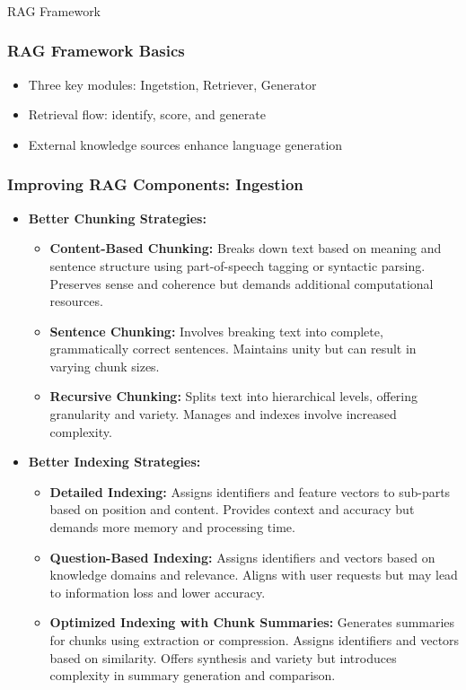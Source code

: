 \begin{frame}[fragile]\frametitle{}
\begin{center}
{\Large RAG Framework}
\end{center}
\end{frame}


\begin{frame}[fragile]\frametitle{RAG Framework Basics}
  \begin{itemize}
    \item Three key modules: Ingetstion, Retriever, Generator
    \item Retrieval flow: identify, score, and generate
    \item External knowledge sources enhance language generation
  \end{itemize}
\end{frame}

\begin{frame}[fragile]\frametitle{Improving RAG Components: Ingestion}
  \begin{itemize}
    \item \textbf{Better Chunking Strategies:}
      \begin{itemize}
        \item \textbf{Content-Based Chunking:} Breaks down text based on meaning and sentence structure using part-of-speech tagging or syntactic parsing. Preserves sense and coherence but demands additional computational resources.
        \item \textbf{Sentence Chunking:} Involves breaking text into complete, grammatically correct sentences. Maintains unity but can result in varying chunk sizes.
        \item \textbf{Recursive Chunking:} Splits text into hierarchical levels, offering granularity and variety. Manages and indexes involve increased complexity.
      \end{itemize}
    \item \textbf{Better Indexing Strategies:}
      \begin{itemize}
        \item \textbf{Detailed Indexing:} Assigns identifiers and feature vectors to sub-parts based on position and content. Provides context and accuracy but demands more memory and processing time.
        \item \textbf{Question-Based Indexing:} Assigns identifiers and vectors based on knowledge domains and relevance. Aligns with user requests but may lead to information loss and lower accuracy.
        \item \textbf{Optimized Indexing with Chunk Summaries:} Generates summaries for chunks using extraction or compression. Assigns identifiers and vectors based on similarity. Offers synthesis and variety but introduces complexity in summary generation and comparison.
      \end{itemize}
  \end{itemize}
\end{frame}

